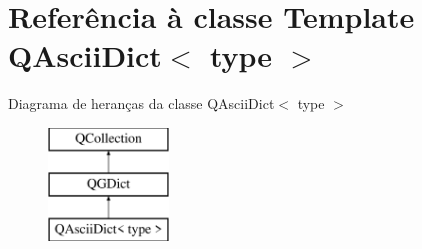 \hypertarget{class_q_ascii_dict}{\section{Referência à classe Template Q\-Ascii\-Dict$<$ type $>$}
\label{class_q_ascii_dict}
}
Diagrama de heranças da classe Q\-Ascii\-Dict$<$ type $>$\begin{figure}[H]
\begin{center}
\leavevmode
\includegraphics[height=3.000000cm]{class_q_ascii_dict}
\end{center}
\end{figure}
